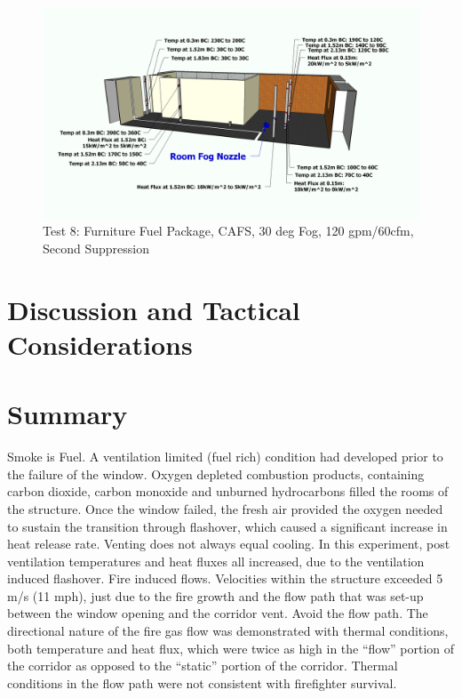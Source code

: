 \documentclass[12pt,oneside]{book}
\begin{document}
\begin{figure}[!ht]
	\includegraphics[width=6in]{../Figures/Pictures/Metric/DelCoFogTest8SecondSuppression}
	\caption{Test 8: Furniture Fuel Package, CAFS, 30 deg Fog, 120 gpm/60cfm, Second Suppression}
	\label{fig:Test_8_Second_Suppression}
\end{figure}

\clearpage
	
\chapter{Discussion and Tactical Considerations}
\label{chap:Discussion_and_Tactical_Considerations}

\chapter{Summary}
\label{chap:Summary}


Smoke is Fuel. A ventilation limited (fuel rich) condition had developed prior to the failure of
the window. Oxygen depleted combustion products, containing carbon dioxide, carbon monoxide and
unburned hydrocarbons filled the rooms of the structure. Once the window failed, the fresh air provided
the oxygen needed to sustain the transition through flashover, which caused a significant increase in heat
release rate.
Venting does not always equal cooling. In this experiment, post ventilation temperatures and
heat fluxes all increased, due to the ventilation induced flashover.
Fire induced flows. Velocities within the structure exceeded 5 m/s (11 mph), just due to the fire
growth and the flow path that was set-up between the window opening and the corridor vent.
Avoid the flow path. The directional nature of the fire gas flow was demonstrated with thermal
conditions, both temperature and heat flux, which were twice as high in the “flow” portion of the
corridor as opposed to the “static” portion of the corridor. Thermal conditions in the
flow path were not consistent with firefighter survival.
\end{document}
